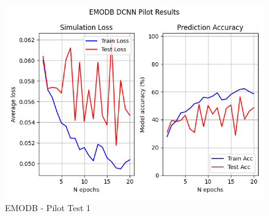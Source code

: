 \begin{figure}[ht]
        \centering
        \includegraphics[scale = 0.6]{images_results/EMODB_PilotTests/EMODB_PilotResults_30-05__15-48.png}
        \caption{EMODB - Pilot Test 1}
        \label{Pilot1_fig}
\end{figure}

